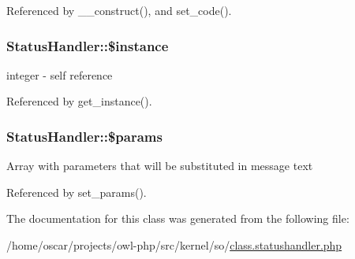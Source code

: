 Referenced by \_\-\_\-construct(), and set\_\-code().

\subsubsection[{\$instance}]{\setlength{\rightskip}{0pt plus 5cm}StatusHandler::\$instance}\label{classStatusHandler_a93400d190e7612dd53fbf0be529a96ee}
integer -\/ self reference 

Referenced by get\_\-instance().

\subsubsection[{\$params}]{\setlength{\rightskip}{0pt plus 5cm}StatusHandler::\$params}\label{classStatusHandler_a599f9c9284340399fdcb7dac9cb7856f}
Array with parameters that will be substituted in message text 

Referenced by set\_\-params().



The documentation for this class was generated from the following file:\begin{DoxyCompactItemize}
\item 
/home/oscar/projects/owl-\/php/src/kernel/so/\hyperlink{class_8statushandler_8php}{class.statushandler.php}\end{DoxyCompactItemize}
